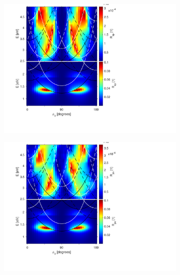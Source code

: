 \begin{figure}[h]  %
    \begin{subfigure}{0.49\textwidth}
        \centering
        \includegraphics[width=\linewidth, trim=1.2cm  1.8cm 6.5cm 0.3cm, clip]{figures/ch4/S5B/contour/S5B_Rsp.pdf}
        \caption{}
    \end{subfigure}
    \begin{subfigure}{0.49\textwidth}
        \centering
        \includegraphics[width=\linewidth, trim=1.2cm  1.8cm 6.5cm 0.3cm, clip]{figures/ch4/S5B/contour/S5B_Rps.pdf}
        \caption{}
    \end{subfigure}
    

\end{figure}
